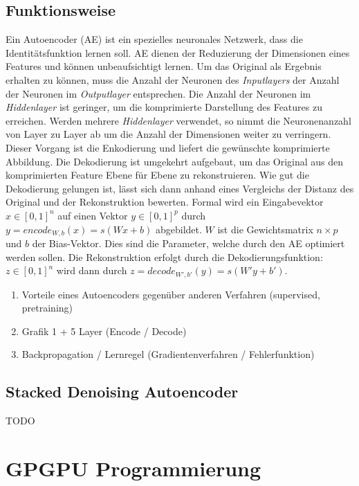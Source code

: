 \subsection{Funktionsweise}
Ein Autoencoder (AE) ist ein spezielles neuronales Netzwerk, dass die Identitätsfunktion lernen soll. AE dienen der Reduzierung der Dimensionen eines Features und können unbeaufsichtigt lernen. Um das Original als Ergebnis erhalten zu können, muss die Anzahl der Neuronen des \textit{Inputlayers} der Anzahl der Neuronen im \textit{Outputlayer} entsprechen. Die Anzahl der Neuronen im \textit{Hiddenlayer} ist geringer, um die komprimierte Darstellung des Features zu erreichen. Werden mehrere \textit{Hiddenlayer} verwendet, so nimmt die Neuronenanzahl von Layer zu Layer ab um die Anzahl der Dimensionen weiter zu verringern. Dieser Vorgang ist die Enkodierung und liefert die gewünschte komprimierte Abbildung. Die Dekodierung ist umgekehrt aufgebaut, um das Original aus den komprimierten Feature Ebene für Ebene zu rekonstruieren. Wie gut die Dekodierung gelungen ist, lässt sich dann anhand eines Vergleichs der Distanz des Original und der Rekonstruktion bewerten. Formal wird ein Eingabevektor $x \in [0,1]^n$ auf einen Vektor $y \in [0,1]^p$ durch $y = encode_{W,b}(x) = s(Wx + b)$ abgebildet. $W$ ist die Gewichtsmatrix $n \times p$ und $b$ der Bias-Vektor. Dies sind die Parameter, welche durch den AE optimiert werden sollen. Die Rekonstruktion erfolgt durch die Dekodierungsfunktion:$z \in [0, 1]^n$ wird dann durch $z = decode_{W', b'}(y) = s(W'y + b')$.

\begin{enumerate}
	\item Vorteile eines Autoencoders gegenüber anderen Verfahren (supervised, pretraining)
	\item Grafik 1 + 5 Layer (Encode / Decode)
	\item Backpropagation / Lernregel (Gradientenverfahren / Fehlerfunktion)
\end{enumerate}

\cite{ssn1997}

\subsection{Stacked Denoising Autoencoder}

TODO

\section{GPGPU Programmierung}

